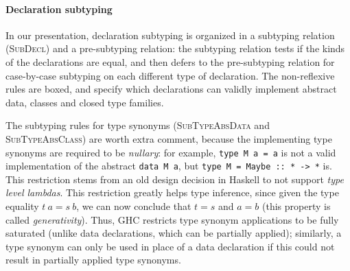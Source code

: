 \paragraph{Declaration subtyping}
In our presentation, declaration subtyping is organized in a subtyping
relation (\textsc{SubDecl}) and a pre-subtyping relation: the subtyping
relation tests if the kinds of the declarations are equal, and then
defers to the pre-subtyping relation for case-by-case subtyping on each
different type of declaration.  The non-reflexive rules are boxed,
and specify which declarations can validly implement abstract data,
classes and closed type families.

The subtyping rules for type synonyms (\textsc{SubTypeAbsData} and
\textsc{SubTypeAbsClass}) are worth extra comment, because the implementing
type synonyms are required to be \emph{nullary}: for example, \verb|type M a = a|
is not a valid implementation of the abstract \verb|data M a|,
but \verb|type M = Maybe :: * -> *| is.  This restriction
stems from an old design decision in Haskell to not support \emph{type level
lambdas}.  This restriction greatly helps type inference, since given the
type equality $t~a = s~b$, we can now conclude that $t = s$ and $a = b$
(this property is called \emph{generativity}).  Thus, GHC restricts type
synonym applications to be fully saturated (unlike data declarations, which can
be partially applied); similarly, a type synonym can only be used in place
of a data declaration if this could not result in partially applied type
synonyms.

%

